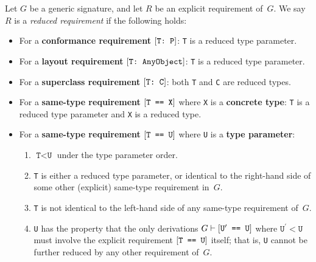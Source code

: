 \documentclass[../generics]{subfiles}
\begin{document}
\begin{definition}\label{reduced requirement}
Let $G$ be a generic signature, and let $R$ be an explicit requirement of~$G$. We say $R$ is a \emph{reduced requirement} if the following holds:
\begin{itemize}
\item For a \textbf{conformance requirement} $[\texttt{T:~P}]$: \texttt{T} is a reduced type parameter.
\item For a \textbf{layout requirement} $[\texttt{T:~AnyObject}]$: \texttt{T} is a reduced type parameter.
\item For a \textbf{superclass requirement} $[\texttt{T:~C}]$: both \texttt{T} and \texttt{C} are reduced types.
\item For a \textbf{same-type requirement} $[\texttt{T == X}]$ where \texttt{X} is a \textbf{concrete type}: \texttt{T} is a reduced type parameter and \texttt{X} is a reduced type.
\item For a \textbf{same-type requirement} $[\texttt{T == U}]$ where \texttt{U} is a \textbf{type parameter}:
\begin{enumerate}
\item $\texttt{T} < \texttt{U}$ under the type parameter order.
\item \texttt{T} is either a reduced type parameter, or identical to the right-hand side of some other (explicit) same-type requirement in~$G$.
\item \texttt{T} is not identical to the left-hand side of any same-type requirement of~$G$.
\item \texttt{U} has the property that the only derivations $G\vdash[\texttt{$\texttt{U}^\prime$ == U}]$ where $\texttt{U}^\prime<\texttt{U}$ must involve the explicit requirement $[\texttt{T == U}]$ itself; that is, \texttt{U} cannot be further reduced by any other requirement of~$G$.
\end{enumerate}
\end{itemize}
\end{definition}
\end{document}
